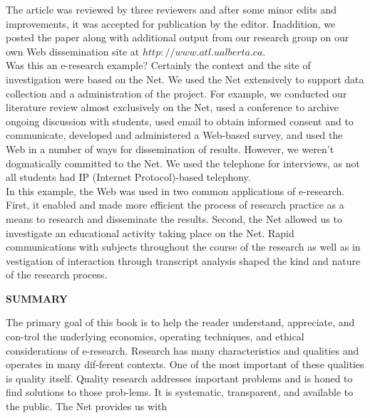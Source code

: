 \documentclass[8pt]{beamer}
\begin{document}
\begin{frame}
\small{ The article was reviewed by three reviewers and after some minor edits and improvements, it was accepted for publication by the editor. Inaddition, we posted the paper along with additional output from our research group on our own Web dissemination site at $http://www.atl.ualberta.ca.$\\
 \hspace*{0.4cm} Was this an e-research example? Certainly the context and the site of investigation were based on the Net. We used the Net extensively to support data collection and a administration of the project. For example, we conducted our literature review almost exclusively on the Net, used a conference to archive ongoing discussion with students, used email to obtain informed consent and to communicate, developed and administered a Web-based survey, and used the Web in a number of ways for dissemination of results. However, we weren't dogmatically committed to the Net. We used the telephone for interviews, as not all students had IP (Internet Protocol)-based telephony.\\
 In this example, the Web was used in two common applications of e-research. First, it enabled and made more efficient the process of research practice as a means to research and disseminate the results. Second, the Net allowed us to investigate an educational activity taking place on the Net. Rapid communications with subjects throughout the course of the research as well as in vestigation of interaction through transcript analysis shaped the kind and nature of the research process.}\\
 
 \vspace*{0.6cm}
\end{frame}

\begin{frame}
\large{
\textbf{SUMMARY}
}

\vspace*{0.3cm}
The primary goal of this book is to help the reader understand, appreciate, and con-trol the underlying economics, operating techniques, and ethical considerations of e-research. Research has many characteristics and qualities and operates in many dif-ferent contexts. One of the most important of these qualities is quality itself. Quality research addresses important problems and is honed to find solutions to those prob-lems. It is systematic, transparent, and available to the public. The Net provides us with \\
\end{frame}
\end{document}
